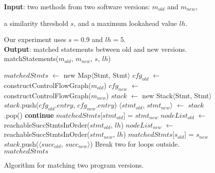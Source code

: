 \begin{figure}[t]
\textbf{Input}: two methods from two software versions: $\mathit{m_{old}}$ and $m_{new}$,

\quad a similarity threshold $\mathit{s}$, and a maximum lookahead value $\mathit{lh}$. 

\quad Our experiment uses $\mathit{s}=0.9$ and $\mathit{lh}=5$.\\
\textbf{Output}: matched statements between old and new versions.
\vspace{-4mm}%
matchStatements($\mathit{m_{old}}$, $\mathit{m_{new}}$, $\mathit{s}$, $\mathit{lh}$)\\
\begin{algorithmic}[1]
\STATE $\mathit{matchedStmts}$ $\leftarrow$ new Map$\langle$Stmt, Stmt$\rangle$
\STATE $\mathit{cfg_{old}}$ $\leftarrow$ constructControlFlowGraph($\mathit{m_{old}}$)
\STATE $\mathit{cfg_{new}}$ $\leftarrow$ constructControlFlowGraph($\mathit{m_{new}}$)
\STATE $\mathit{stack}$ $\leftarrow$ new Stack$\langle$Stmt, Stmt$\rangle$
\STATE $\mathit{stack}$.push($\mathit{cfg_{old}}$.$\mathit{entry}$, $\mathit{cfg_{new}}$.$\mathit{entry}$)
\STATE $\langle$$\mathit{stmt_{old}}$, $\mathit{stmt_{new}}$$\rangle$ $\leftarrow$ $\mathit{stack}$.pop()
\STATE \textbf{continue}
\ENDIF
{}
\STATE $\mathit{matchedStmts}$[$\mathit{stmt_{old}}$] = $\mathit{stmt_{new}}$
\ELSE
\STATE $\mathit{nodeList_{old}}$ $\leftarrow$ reachableSuccStmtsInOrder($\mathit{stmt_{old}}$, $\mathit{lh}$)
\STATE $\mathit{nodeList_{new}}$ $\leftarrow$ reachableSuccStmtsInOrder($\mathit{stmt_{new}}$, $\mathit{lh}$)
\STATE $\mathit{matchedStmts}$[$\mathit{s_{old}}$] = $\mathit{s_{new}}$
\STATE $\mathit{stack}$.push($\langle$$\mathit{succ_{old}}$, $\mathit{succ_{new}}$$\rangle$)
\ENDFOR
\ENDFOR
\STATE Break two for loops outside.
\ENDIF
\ENDFOR
\ENDFOR
\ENDIF
\ENDWHILE
\RETURN $\mathit{matchedStmts}$
\end{algorithmic}
\vspace{-4mm}
\caption{Algorithm for matching two program versions.
\label{fig:matching}
}
\end{figure}
